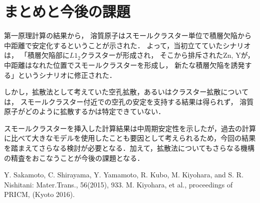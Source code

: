 \documentclass[a4j,twocolumn]{jsarticle}
\begin{document}
\vspace{-1.4\baselineskip}

\section{まとめと今後の課題}
第一原理計算の結果から，
溶質原子はスモールクラスター単位で積層欠陥から中距離で安定化するということが示された．
よって，当初立てていたシナリオは，
「積層欠陥部に$L1_2$クラスターが形成され，
そこから排斥されたZn, Yが，
中距離はなれた位置でスモールクラスターを形成し，
新たな積層欠陥を誘発する」というシナリオに修正された．

しかし，拡散法として考えていた空孔拡散，あるいはクラスター拡散については，
スモールクラスター付近での空孔の安定を支持する結果は得られず，
溶質原子がどのように拡散するかは特定できていない．

スモールクラスターを挿入した計算結果は中周期安定性を示したが，過去の計算に比べて大きなモデルを使用したことも要因として考えられるため，今回の結果を踏まえてさらなる検討が必要となる．加えて，拡散法についてもさらなる機構の精査をおこなうことが今後の課題となる．
\vspace{0.2\baselineskip}

{\small\setlength\baselineskip{10pt}	%
\begin{thebibliography}{9}
Y. Sakamoto, C. Shirayama, Y. Yamamoto, R. Kubo, M. Kiyohara, and S. R. Nishitani: Mater.Trans., 56(2015), 933.
 M. Kiyohara, et al., proceedings of PRICM, (Kyoto 2016).
\end{thebibliography}
}
\end{document}
